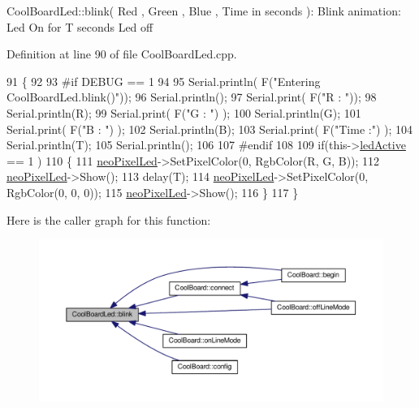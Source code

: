 Cool\+Board\+Led\+::blink( Red , Green , Blue , Time in seconds )\+: Blink animation\+: Led On for T seconds Led off 

Definition at line 90 of file Cool\+Board\+Led.\+cpp.


\begin{DoxyCode}
91 \{
92 
93 \textcolor{preprocessor}{#if DEBUG == 1}
94 
95     Serial.println( F(\textcolor{stringliteral}{"Entering CoolBoardLed.blink()"}));
96     Serial.println();
97     Serial.print( F(\textcolor{stringliteral}{"R : "}));
98     Serial.println(R);
99     Serial.print( F(\textcolor{stringliteral}{"G : "}) );
100     Serial.println(G);
101     Serial.print( F(\textcolor{stringliteral}{"B : "}) );
102     Serial.println(B);
103     Serial.print( F(\textcolor{stringliteral}{"Time :"}) );
104     Serial.println(T);
105     Serial.println();
106 
107 \textcolor{preprocessor}{#endif  }
108 
109     \textcolor{keywordflow}{if}(this->\hyperlink{class_cool_board_led_aadd04d2ecf123247718d77f42fba7f08}{ledActive} == 1 )
110     \{
111         \hyperlink{class_cool_board_led_ac2c13fa462a010cd9242bf297c013923}{neoPixelLed}->SetPixelColor(0, RgbColor(R, G, B));
112         \hyperlink{class_cool_board_led_ac2c13fa462a010cd9242bf297c013923}{neoPixelLed}->Show();
113         delay(T);
114         \hyperlink{class_cool_board_led_ac2c13fa462a010cd9242bf297c013923}{neoPixelLed}->SetPixelColor(0, RgbColor(0, 0, 0));
115         \hyperlink{class_cool_board_led_ac2c13fa462a010cd9242bf297c013923}{neoPixelLed}->Show();
116     \}
117 \}
\end{DoxyCode}
Here is the caller graph for this function\+:\nopagebreak
\begin{figure}[H]
\begin{center}
\leavevmode
\includegraphics[width=350pt]{de/dc0/class_cool_board_led_a96e1ea13003eee34c9dbcef340404426_icgraph}
\end{center}
\end{figure}
\mbox{\label{class_cool_board_led_a1b60e5e30bea96c49ed62ed1bf1ffc8b}} 
